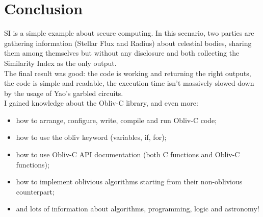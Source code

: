 \documentclass[a4paper]{article}
\begin{document}
\section{Conclusion}

SI is a simple example about secure computing. In this scenario, two parties are gathering information (Stellar Flux and Radius) about celestial bodies, sharing them among themselves but without any disclosure and both collecting the Similarity Index as the only output. \\
The final result was good: the code is working and returning the right outputs, the code is simple and readable, the execution time isn't massively slowed down by the usage of Yao's garbled circuits. \\
I gained knowledge about the Obliv-C library, and even more:

\begin{itemize}
    \item how to arrange, configure, write, compile and run Obliv-C code;
    \item how to use the obliv keyword (variables, if, for);
    \item how to use Obliv-C API documentation (both C functions and Obliv-C functions);
    \item how to implement oblivious algorithms starting from their non-oblivious counterpart;
    \item and lots of information about algorithms, programming, logic and astronomy!
\end{itemize}
\end{document}
